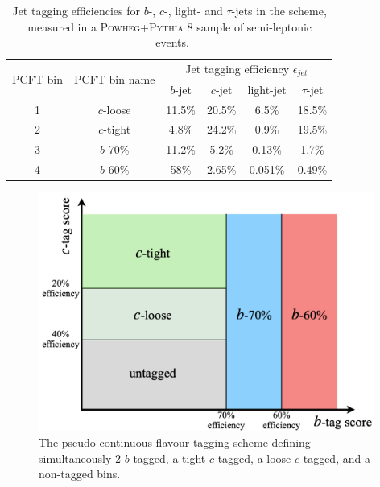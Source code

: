 \begin{itemize}[leftmargin=*]
\begin{table}[h!]
  \begin{center}
      \begin{tabular}{c|c|cccc}
        \hline \hline
        \multirow{2}{*}{PCFT bin} & \multirow{2}{*}{PCFT bin name} & \multicolumn{4}{c}{Jet tagging efficiency $\epsilon_{jet}$}\\
        & & $b$-jet &  $c$-jet &  light-jet & $\tau$-jet \\ 
        \hline
        1 & $c$-loose & 11.5\% & 20.5\% & 6.5\%   & 18.5\%\\
        2 & $c$-tight & 4.8\%  & 24.2\% & 0.9\%   & 19.5\%\\
        3 & $b$-70\%  & 11.2\% &  5.2\% & 0.13\%  &  1.7\%\\
        4 & $b$-60\%  & 58\%   & 2.65\% & 0.051\% & 0.49\%\\
        \hline \hline
      \end{tabular}
    \caption{Jet tagging efficiencies for $b$-, $c$-, light- and $\tau$-jets in the  scheme, measured in a \textsc{Powheg}+\textsc{Pythia} 8 sample of semi-leptonic \ttb\ events.}
    \label{tbl:PCFTtageff} %
  \end{center}
\end{table}

\begin{figure}[h!]
  \center
    \begin{minipage}[c]{0.69\textwidth}
      \includegraphics[width=0.98\textwidth]{Images/VH/pseudocontinuous.png}
    \end{minipage}
    \begin{minipage}[c]{0.3\textwidth}
      \caption{The pseudo-continuous flavour tagging scheme defining simultaneously 2 $b$-tagged, a tight $c$-tagged, a loose $c$-tagged, and a non-tagged bins.} 
      \label{fig:pseudotag}
    \end{minipage}
\end{figure}


\end{itemize}
